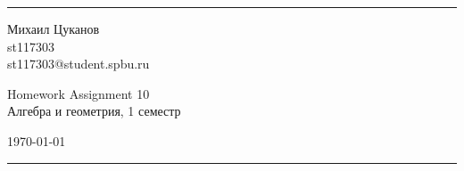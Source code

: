 \documentclass[a4paper, 12pt]{article}
\begin{document}

\fancyhead[C]{}
\hrule \medskip %
\begin{minipage}{0.295\textwidth}
  \raggedright\footnotesize
  Михаил Цуканов \hfill\\
  st117303 \hfill\\
  st117303@student.spbu.ru
\end{minipage}
\begin{minipage}{0.4\textwidth}
  \centering\large
  Homework Assignment 10\\
  \normalsize
  Алгебра и геометрия, 1 семестр\\
\end{minipage}
\begin{minipage}{0.295\textwidth}
  \raggedleft
  \today\hfill\\
\end{minipage}
\medskip\hrule
\bigskip

\end{document}
